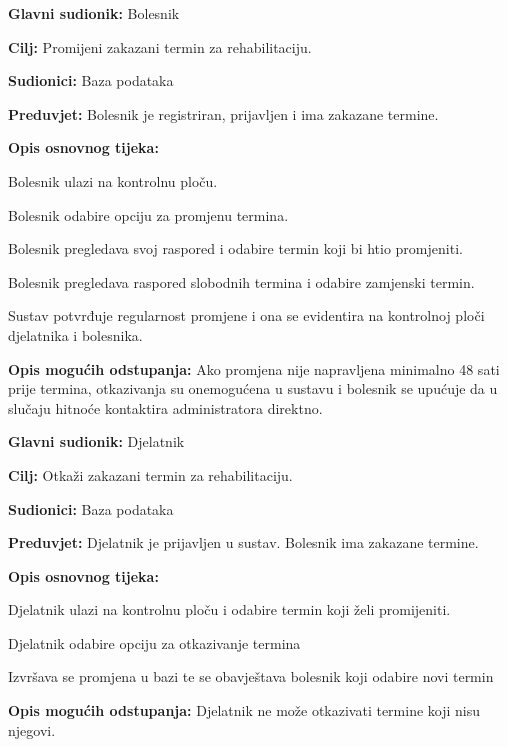 	\item \textbf{Glavni sudionik:} Bolesnik
	\item \textbf{Cilj:} Promijeni zakazani termin za rehabilitaciju.
	\item \textbf{Sudionici:} Baza podataka
	\item \textbf{Preduvjet:} Bolesnik je registriran, prijavljen i ima zakazane termine.
	\item \textbf{Opis osnovnog tijeka:}
	\begin{packed_enum}
        \item Bolesnik ulazi na kontrolnu ploču.
		\item Bolesnik odabire opciju za promjenu termina.
		\item Bolesnik pregledava svoj raspored i odabire termin koji bi htio promjeniti.
		\item Bolesnik pregledava raspored slobodnih termina i odabire zamjenski termin.
		\item Sustav potvrđuje regularnost promjene i ona se evidentira na kontrolnoj ploči djelatnika i bolesnika. 
	\end{packed_enum}
    \item \textbf{Opis mogućih odstupanja:}
	Ako promjena nije napravljena minimalno 48 sati prije termina, otkazivanja su onemogućena u sustavu i bolesnik se upućuje da u slučaju hitnoće kontaktira administratora direktno. 
\closeusecase

	\item \textbf{Glavni sudionik:} Djelatnik
	\item \textbf{Cilj:} Otkaži zakazani termin za rehabilitaciju.
	\item \textbf{Sudionici:} Baza podataka
	\item \textbf{Preduvjet:} Djelatnik je prijavljen u sustav. Bolesnik ima zakazane termine.
	\item \textbf{Opis osnovnog tijeka:}
	\begin{packed_enum}
        \item Djelatnik ulazi na kontrolnu ploču i odabire termin koji želi promijeniti.
		\item Djelatnik odabire opciju za otkazivanje termina 
        \item Izvršava se promjena u bazi te se obavještava bolesnik koji odabire novi termin 
	\end{packed_enum}
    \item \textbf{Opis mogućih odstupanja:}
	Djelatnik ne može otkazivati termine koji nisu njegovi. 
\closeusecase

